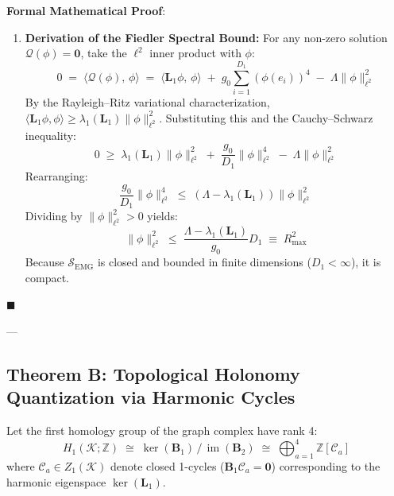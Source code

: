 \documentclass[
    12pt,
    a4paper,
    headings=normal,
    twoside=false,
    open=any,
    parskip=half
]{scrbook}
\newcommand{\moduliS}{\mathscr{S}_{\text{EMG}}}
\newenvironment{myproof}[1][]{%
  \par\vspace{6pt}\noindent\textbf{\sffamily\color{maincolor}Formal Mathematical Proof\ifstrempty{#1}{}{ (#1)}}:\par\nopagebreak
}{%
  \penalty50\hfill\ensuremath{\blacksquare}\par\vspace{6pt}
}
\begin{document}
\begin{myproof}
\begin{enumerate}[label=\textbf{Part \arabic*:}, leftmargin=2em]
    \item \textbf{Derivation of the Fiedler Spectral Bound:}
    For any non-zero solution $\mathcal{Q}(\phi) = \mathbf{0}$, take the $\ell^2$ inner product with $\phi$:
    \begin{equation*}
    0 \;=\; \langle \mathcal{Q}(\phi), \, \phi \rangle \;=\; \langle \mathbf{L}_1 \phi, \, \phi \rangle \;+\; g_0 \sum_{i=1}^{D_1} (\phi(e_i))^4 \;-\; \Lambda \|\phi\|_{\ell^2}^2
    \end{equation*}
    By the Rayleigh--Ritz variational characterization, $\langle \mathbf{L}_1 \phi, \phi \rangle \ge \lambda_1(\mathbf{L}_1) \|\phi\|_{\ell^2}^2$. Substituting this and the Cauchy--Schwarz inequality:
    \begin{equation*}
    0 \;\ge\; \lambda_1(\mathbf{L}_1) \|\phi\|_{\ell^2}^2 \;+\; \frac{g_0}{D_1} \|\phi\|_{\ell^2}^4 \;-\; \Lambda \|\phi\|_{\ell^2}^2
    \end{equation*}
    Rearranging:
    \begin{equation*}
    \frac{g_0}{D_1} \|\phi\|_{\ell^2}^4 \;\le\; \left( \Lambda - \lambda_1(\mathbf{L}_1) \right) \|\phi\|_{\ell^2}^2
    \end{equation*}
    Dividing by $\|\phi\|_{\ell^2}^2 > 0$ yields:
    \begin{equation*}
    \|\phi\|_{\ell^2}^2 \;\le\; \frac{\Lambda - \lambda_1(\mathbf{L}_1)}{g_0} D_1 \;\equiv\; R_{\max}^2
    \end{equation*}
    Because $\moduliS$ is closed and bounded in finite dimensions ($D_1 < \infty$), it is compact.
\end{enumerate}
\end{myproof}

---

\subsection{Theorem B: Topological Holonomy Quantization via Harmonic Cycles}

Let the first homology group of the graph complex have rank 4:
\begin{equation}
H_1(\mathcal{K}; \mathbb{Z}) \;\cong\; \ker(\mathbf{B}_1) \,/\, \operatorname{im}(\mathbf{B}_2) \;\cong\; \bigoplus_{a=1}^4 \mathbb{Z}[\mathcal{C}_a]
\end{equation}
where $\mathcal{C}_a \in Z_1(\mathcal{K})$ denote closed 1-cycles ($\mathbf{B}_1 \mathcal{C}_a = \mathbf{0}$) corresponding to the harmonic eigenspace $\ker(\mathbf{L}_1)$.
\end{document}

